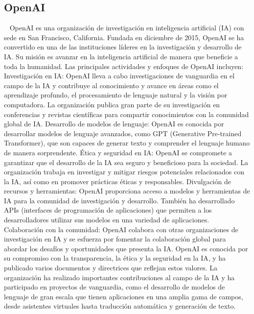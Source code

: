 \subsection{OpenAI}~\cite{chatgpt1}
OpenAI es una organización de investigación en inteligencia artificial (IA) con sede en San Francisco, California. Fundada en diciembre de 2015, OpenAI se ha convertido en una de las instituciones líderes en la investigación y desarrollo de IA. Su misión es avanzar en la inteligencia artificial de manera que beneficie a toda la humanidad.
Las principales actividades y enfoques de OpenAI incluyen:
Investigación en IA: OpenAI lleva a cabo investigaciones de vanguardia en el campo de la IA y contribuye al conocimiento y avance en áreas como el aprendizaje profundo, el procesamiento de lenguaje natural y la visión por computadora. La organización publica gran parte de su investigación en conferencias y revistas científicas para compartir conocimientos con la comunidad global de IA.
Desarrollo de modelos de lenguaje: OpenAI es conocida por desarrollar modelos de lenguaje avanzados, como GPT (Generative Pre-trained Transformer), que son capaces de generar texto y comprender el lenguaje humano de manera sorprendente.
Ética y seguridad en IA: OpenAI se compromete a garantizar que el desarrollo de la IA sea seguro y beneficioso para la sociedad. La organización trabaja en investigar y mitigar riesgos potenciales relacionados con la IA, así como en promover prácticas éticas y responsables.
Divulgación de recursos y herramientas: OpenAI proporciona acceso a modelos y herramientas de IA para la comunidad de investigación y desarrollo. También ha desarrollado APIs (interfaces de programación de aplicaciones) que permiten a los desarrolladores utilizar sus modelos en una variedad de aplicaciones.
Colaboración con la comunidad: OpenAI colabora con otras organizaciones de investigación en IA y se esfuerza por fomentar la colaboración global para abordar los desafíos y oportunidades que presenta la IA.
OpenAI es conocida por su compromiso con la transparencia, la ética y la seguridad en la IA, y ha publicado varios documentos y directrices que reflejan estos valores. La organización ha realizado importantes contribuciones al campo de la IA y ha participado en proyectos de vanguardia, como el desarrollo de modelos de lenguaje de gran escala que tienen aplicaciones en una amplia gama de campos, desde asistentes virtuales hasta traducción automática y generación de texto.

